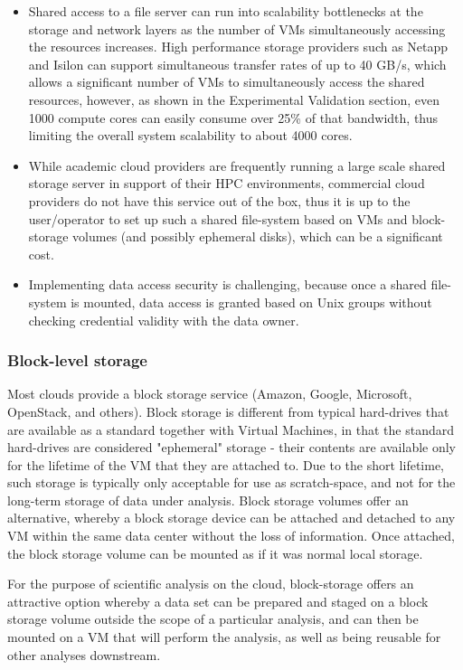 \begin{itemize}
\item Shared access to a file server can run into scalability bottlenecks at the storage and network layers as the number of VMs simultaneously accessing the resources increases. High performance storage providers such as Netapp and Isilon can support simultaneous transfer rates of up to 40 GB/s, which allows a significant number of VMs to simultaneously access the shared resources, however, as shown in the Experimental Validation section, even 1000 compute cores can easily consume over 25\% of that bandwidth, thus limiting the overall system scalability to about 4000 cores.
\item While academic cloud providers are frequently running a large scale shared storage server in support of their HPC environments, commercial cloud providers do not have this service out of the box, thus it is up to the user/operator to set up such a shared file-system based on VMs and block-storage volumes (and possibly ephemeral disks), which can be a significant cost.
\item Implementing data access security is challenging, because once a shared file-system is mounted, data access is granted based on Unix groups without checking credential validity with the data owner.
\end{itemize}

\subsubsection{Block-level storage}

Most clouds provide a block storage service (Amazon, Google, Microsoft, OpenStack, and others). Block storage is different from typical hard-drives that are available as a standard together with Virtual Machines, in that the standard hard-drives are considered "ephemeral" storage - their contents are available only for the lifetime of the VM that they are attached to. Due to the short lifetime, such storage is typically only acceptable for use as scratch-space, and not for the long-term storage of data under analysis. Block storage volumes offer an alternative, whereby a block storage device can be attached and detached to any VM within the same data center without the loss of information. Once attached, the block storage volume can be mounted as if it was normal local storage. 

For the purpose of scientific analysis on the cloud, block-storage offers an attractive option whereby a data set can be prepared and staged on a block storage volume outside the scope of a particular analysis, and can then be mounted on a VM that will perform the analysis, as well as being reusable for other analyses downstream. 

